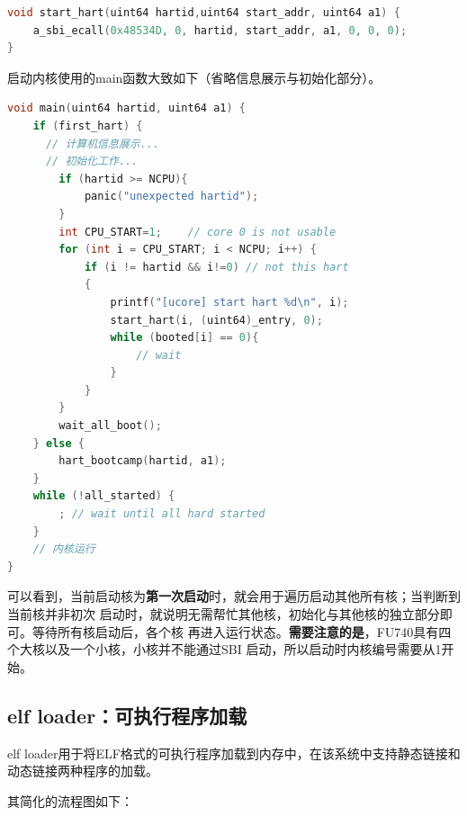 \documentclass[UTF8,a4paper,10pt]{ctexart}
\begin{document}
\begin{lstlisting}[title=内核镜像入口,frame=trbl,language={C}]
void start_hart(uint64 hartid,uint64 start_addr, uint64 a1) {
    a_sbi_ecall(0x48534D, 0, hartid, start_addr, a1, 0, 0, 0);
}
\end{lstlisting}

启动内核使用的main函数大致如下（省略信息展示与初始化部分）。

\begin{lstlisting}[title=内核启动的main函数,frame=trbl,language={C}]
  void main(uint64 hartid, uint64 a1) {
    if (first_hart) {
      // 计算机信息展示...
      // 初始化工作...
        if (hartid >= NCPU){
            panic("unexpected hartid");
        }
        int CPU_START=1;    // core 0 is not usable
        for (int i = CPU_START; i < NCPU; i++) {
            if (i != hartid && i!=0) // not this hart
            {
                printf("[ucore] start hart %d\n", i);
                start_hart(i, (uint64)_entry, 0);
                while (booted[i] == 0){
                    // wait
                }
            }
        }
        wait_all_boot();
    } else {
        hart_bootcamp(hartid, a1);
    }
    while (!all_started) {
        ; // wait until all hard started
    }
    // 内核运行
}
  \end{lstlisting}

可以看到，当前启动核为\textbf{第一次启动}时，就会用于遍历启动其他所有核；当判断到当前核并非初次
启动时，就说明无需帮忙其他核，初始化与其他核的独立部分即可。等待所有核启动后，各个核
再进入运行状态。\textbf{需要注意的是}，FU740具有四个大核以及一个小核，小核并不能通过SBI
启动，所以启动时内核编号需要从1开始。

\subsection{elf loader：可执行程序加载}

elf loader用于将ELF格式的可执行程序加载到内存中，在该系统中支持静态链接和动态链接两种程序的加载。

其简化的流程图如下：
\end{document}
